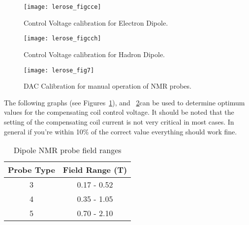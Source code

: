 {%

\begin{figure}
\begin{center}
\texttt{[image: lerose\_figcce]}
{\linespread{1.}
\caption[Spectrometers: Control Voltage Calibration for Electron Dipole]{Control Voltage calibration for Electron Dipole.}
\label{fig:nmrcomp4}}
\end{center}
\end{figure}

\begin{figure}
\begin{center}
\texttt{[image: lerose\_figcch]}
{\linespread{1.}
\caption[Spectrometers: Control Voltage Calibration for Hadron Dipole] {Control Voltage calibration for Hadron Dipole.}
\label{fig:nmrcomp5}}
\end{center}
\end{figure}

\begin{figure}
\begin{center}
\texttt{[image: lerose\_fig7]}
{\linespread{1.}
\caption[Spectrometers: NMR Probe DAC Calibration]{DAC Calibration for manual operation of NMR probes.}
\label{fig:nmr_dac}}
\end{center}
\end{figure}

The following graphs (see Figures~\ref{fig:nmrcomp4}), 
and ~\ref{fig:nmrcomp5}can be used to determine optimum values for the 
compensating coil control voltage.  It should be noted that the setting 
of the compensating coil current is not very critical in most cases.  In 
general if you're within 10\% of the correct value everything should 
work fine.



\begin{table}
\begin{center}
\begin{tabular}{|cc|} \hline
Probe Type & Field Range (T) \\ \hline 
3 & 0.17 - 0.52 \\
4 & 0.35 - 1.05 \\
5 & 0.70 - 2.10 \\ \hline
\end{tabular}
\caption[Spectrometers: Dipole NMR Probe Field Ranges]{Dipole NMR probe field ranges}
\label{nmr_range}
\end{center}
\end{table}

}
